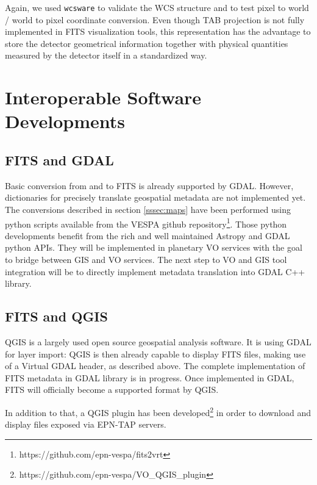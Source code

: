 Again, we used \texttt{wcsware} to validate the WCS structure and to test pixel to
world / world to pixel coordinate conversion.
Even though TAB projection is not fully implemented in FITS visualization tools,
this representation has the advantage to store the detector geometrical information
together with physical quantities measured by the detector itself in a standardized way.

\section{Interoperable Software Developments}
\label{sec:softdev}

\subsection{FITS and GDAL}
Basic conversion from and to FITS is already supported by GDAL.
However, dictionaries for precisely translate geospatial metadata are not implemented
yet.
The conversions described in section \ref{sssec:maps} have been performed using python
scripts available from the VESPA github repository\footnote{https://github.com/epn-vespa/fits2vrt}.
Those python developments benefit from the rich and well maintained Astropy and GDAL
python APIs.
They will be implemented in planetary VO services with the goal to bridge between GIS 
and VO services.
The next step to VO and GIS tool integration will be to directly implement metadata 
translation into GDAL C++ library. 

\subsection{FITS and QGIS}
QGIS is a largely used open source geospatial analysis software.
It is using GDAL for layer import: QGIS is then already capable to display FITS files,
making use of a Virtual GDAL header, as described above.
The complete implementation of FITS metadata in GDAL library is in progress.
Once implemented in GDAL, FITS will officially become a supported format by QGIS.

In addition to that, a QGIS plugin has been developed\footnote{https://github.com/epn-vespa/VO\_QGIS\_plugin}
\citep{Minin} in order to download and display files exposed via EPN-TAP servers.

